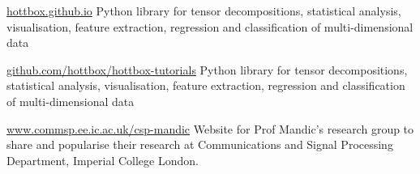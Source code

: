 

\begin{cventries}

            {\href{https://hottbox.github.io}{hottbox.github.io}} %
            { %
                Python library for tensor decompositions, statistical analysis, visualisation, feature extraction, regression and classification of multi-dimensional data
            }

            {\href{https://github.com/hottbox/hottbox-tutorials}{github.com/hottbox/hottbox-tutorials}} %
            { %
                Python library for tensor decompositions, statistical analysis, visualisation, feature extraction, regression and classification of multi-dimensional data
            }

            {\href{http://www.commsp.ee.ic.ac.uk/~csp-mandic/}{www.commsp.ee.ic.ac.uk/\urltilde csp-mandic}} %
            { %
                Website for Prof Mandic's research group to share and popularise their research at Communications and Signal Processing Department, Imperial College London.
            }

\end{cventries}
